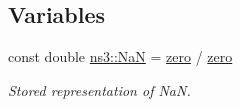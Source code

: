 \subsection*{Variables}
\begin{DoxyCompactItemize}
\item 
const double \hyperlink{namespacens3_ac112282f7204b6205131c5a6f1a14542}{ns3\+::\+NaN} = \hyperlink{data-calculator_8cc_a548c77babcdf18ce7b6b96e73fb912cd}{zero} / \hyperlink{data-calculator_8cc_a548c77babcdf18ce7b6b96e73fb912cd}{zero}
\begin{DoxyCompactList}\small\item\em Stored representation of NaN. \end{DoxyCompactList}\end{DoxyCompactItemize}
